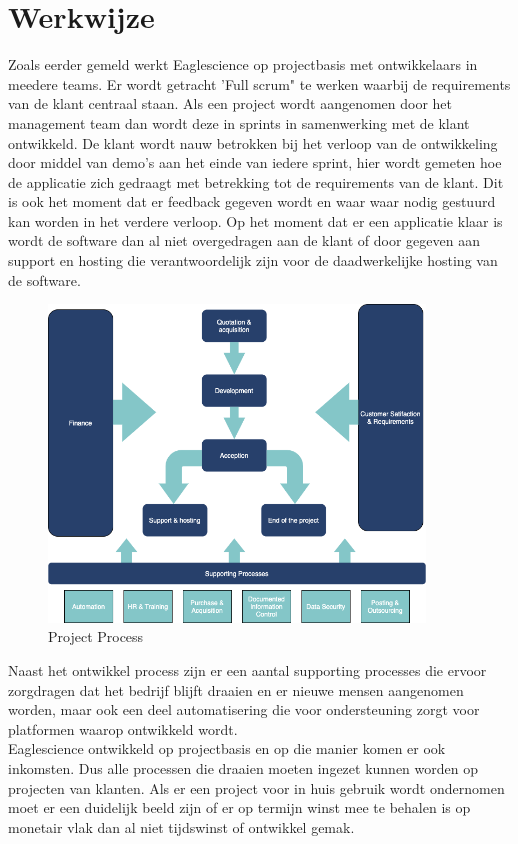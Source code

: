 \section{Werkwijze}
Zoals eerder gemeld werkt Eaglescience op projectbasis met ontwikkelaars in meedere teams. Er wordt getracht 'Full scrum" te werken waarbij de requirements van de klant centraal staan. Als een project wordt aangenomen door het management team dan wordt deze in sprints in samenwerking met de klant ontwikkeld. De klant wordt nauw betrokken bij het verloop van de ontwikkeling door middel van demo's aan het einde van iedere sprint, hier wordt gemeten hoe de applicatie zich gedraagt met betrekking tot de requirements van de klant. Dit is ook het moment dat er feedback gegeven wordt en waar waar nodig gestuurd kan worden in het verdere verloop. Op het moment dat er een applicatie klaar is wordt de software dan al niet overgedragen aan de klant of door gegeven aan support en hosting die verantwoordelijk zijn voor de daadwerkelijke hosting van de software. 
\begin{figure}[bth]
\myfloatalign
\includegraphics[width=10cm]{gfx/ProcessFlow}
\caption{Project Process}
\label{fig:Project Process}
\end{figure}
Naast het ontwikkel process zijn er een aantal supporting processes die ervoor zorgdragen dat het bedrijf blijft draaien en er nieuwe mensen aangenomen worden, maar ook een deel automatisering die voor ondersteuning zorgt voor platformen waarop ontwikkeld wordt.\\
Eaglescience ontwikkeld op projectbasis en op die manier komen er ook inkomsten. Dus alle processen die draaien moeten ingezet kunnen worden op projecten van klanten. Als er een project voor in huis gebruik wordt ondernomen moet er een duidelijk beeld zijn of er op termijn winst mee te behalen is op monetair vlak dan al niet tijdswinst of ontwikkel gemak. 

